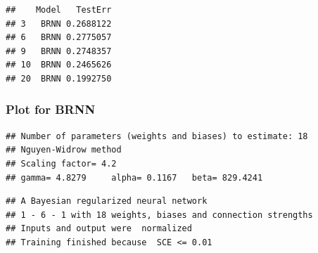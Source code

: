 \begin{Shaded}
\begin{Highlighting}[]
\OtherTok{\textless{}{-}} \NormalTok{(}\NormalTok{(} 
\end{Highlighting}
\end{Shaded}

\begin{verbatim}
##    Model   TestErr
## 3   BRNN 0.2688122
## 6   BRNN 0.2775057
## 9   BRNN 0.2748357
## 10  BRNN 0.2465626
## 20  BRNN 0.1992750
\end{verbatim}

\hypertarget{plot-for-brnn}{%
\subsubsection{Plot for BRNN}\label{plot-for-brnn}}

\begin{Shaded}
\begin{Highlighting}[]
\OtherTok{\textless{}{-}} \SpecialCharTok{\textasciitilde{}}\NormalTok{)   }
\end{Highlighting}
\end{Shaded}

\begin{verbatim}
## Number of parameters (weights and biases) to estimate: 18 
## Nguyen-Widrow method
## Scaling factor= 4.2 
## gamma= 4.8279     alpha= 0.1167   beta= 829.4241
\end{verbatim}

\begin{Shaded}
\begin{Highlighting}[]
\end{Highlighting}
\end{Shaded}

\begin{verbatim}
## A Bayesian regularized neural network 
## 1 - 6 - 1 with 18 weights, biases and connection strengths
## Inputs and output were  normalized
## Training finished because  SCE <= 0.01
\end{verbatim}

